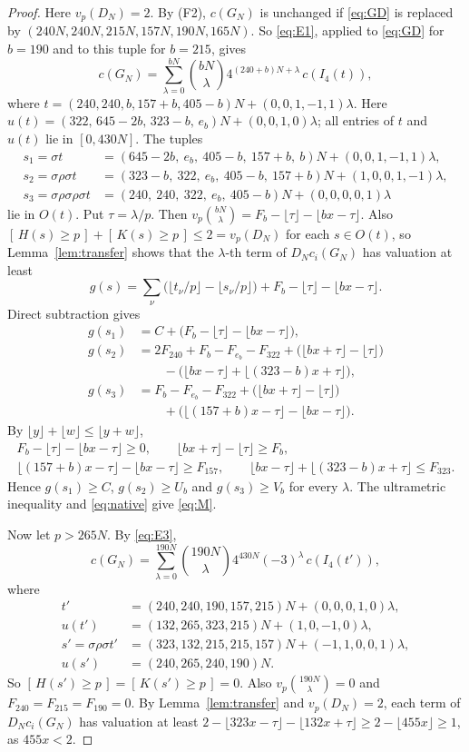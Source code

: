 \documentclass{amsart}
\numberwithin{equation}{section}
\numberwithin{table}{section}
\newcommand{\fl}[1]{\lfloor #1\rfloor}
\newcommand{\br}[1]{[\,#1\,]}
\begin{document}
\begin{proof}
Here $v_p(D_N)=2$. By (F2), $c(G_N)$ is unchanged if \eqref{eq:GD} is
replaced by $(240N,240N,215N,157N,190N,165N)$. So \eqref{eq:E1}, applied to
\eqref{eq:GD} for $b=190$ and to this tuple for $b=215$, gives
\[
c(G_N)=\sum_{\lambda=0}^{bN}\binom{bN}{\lambda}4^{(240+b)N+\lambda}\,c(I_4(t)),
\]
where $t=(240,240,b,157+b,405-b)N+(0,0,1,-1,1)\lambda$. Here
$u(t)=(322,\,645-2b,\,323-b,\,e_b)N+(0,0,1,0)\lambda$; all entries of $t$
and $u(t)$ lie in $[0,430N]$. The tuples
\begin{align*}
s_1=\sigma t&=(645-2b,\ e_b,\ 405-b,\ 157+b,\ b)N+(0,0,1,-1,1)\lambda,\\
s_2=\sigma\rho\sigma t&=(323-b,\ 322,\ e_b,\ 405-b,\ 157+b)N+(1,0,0,1,-1)\lambda,\\
s_3=\sigma\rho\sigma\rho\sigma t&=(240,\ 240,\ 322,\ e_b,\ 405-b)N+(0,0,0,0,1)\lambda
\end{align*}
lie in $O(t)$. Put $\tau=\lambda/p$. Then
$v_p\binom{bN}{\lambda}=F_b-\fl{\tau}-\fl{bx-\tau}$. Also
$\br{H(s)\ge p}+\br{K(s)\ge p}\le2=v_p(D_N)$ for each $s\in O(t)$, so
Lemma~\ref{lem:transfer} shows that the $\lambda$-th term of $D_Nc_i(G_N)$
has valuation at least
\[
g(s)=\sum_\nu\bigl(\fl{t_\nu/p}-\fl{s_\nu/p}\bigr)+F_b-\fl\tau-\fl{bx-\tau}.
\]
Direct subtraction gives
\begin{align*}
g(s_1)&=C+\bigl(F_b-\fl{\tau}-\fl{bx-\tau}\bigr),\\
g(s_2)&=2F_{240}+F_b-F_{e_b}-F_{322}+\bigl(\fl{bx+\tau}-\fl{\tau}\bigr)\\
&\qquad-\bigl(\fl{bx-\tau}+\fl{(323-b)x+\tau}\bigr),\\
g(s_3)&=F_b-F_{e_b}-F_{322}+\bigl(\fl{bx+\tau}-\fl{\tau}\bigr)\\
&\qquad+\bigl(\fl{(157+b)x-\tau}-\fl{bx-\tau}\bigr).
\end{align*}
By $\fl{y}+\fl{w}\le\fl{y+w}$,
\begin{gather*}
F_b-\fl\tau-\fl{bx-\tau}\ge0,\qquad \fl{bx+\tau}-\fl\tau\ge F_b,\\
\fl{(157+b)x-\tau}-\fl{bx-\tau}\ge F_{157},\qquad
\fl{bx-\tau}+\fl{(323-b)x+\tau}\le F_{323}.
\end{gather*}
Hence $g(s_1)\ge C$, $g(s_2)\ge U_b$ and $g(s_3)\ge V_b$ for every $\lambda$.
The ultrametric inequality and \eqref{eq:native} give \eqref{eq:M}.

Now let $p>265N$. By \eqref{eq:E3},
\[
c(G_N)=\sum_{\lambda=0}^{190N}\binom{190N}{\lambda}4^{430N}(-3)^{\lambda}\,c(I_4(t')),
\]
where
\begin{align*}
t'&=(240,240,190,157,215)N+(0,0,0,1,0)\lambda,\\
u(t')&=(132,265,323,215)N+(1,0,-1,0)\lambda,\\
s'=\sigma\rho\sigma t'&=(323,132,215,215,157)N+(-1,1,0,0,1)\lambda,\\
u(s')&=(240,265,240,190)N.
\end{align*}
So $\br{H(s')\ge p}=\br{K(s')\ge p}=0$. Also
$v_p\binom{190N}{\lambda}=0$ and $F_{240}=F_{215}=F_{190}=0$. By
Lemma~\ref{lem:transfer} and $v_p(D_N)=2$, each term of $D_Nc_i(G_N)$ has
valuation at least $2-\fl{323x-\tau}-\fl{132x+\tau}\ge2-\fl{455x}\ge1$, as
$455x<2$.
\end{proof}
\end{document}
